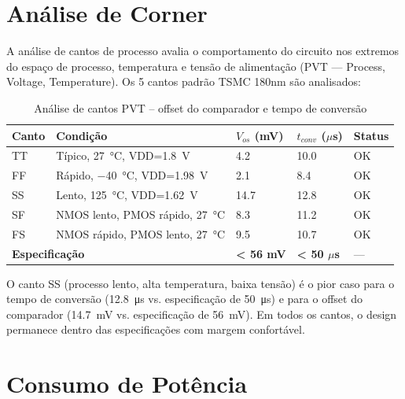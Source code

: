 \documentclass[12pt,a4paper]{article}
\begin{document}
\newpage

\section{Análise de Corner}
\label{sec:corner}

A análise de cantos de processo avalia o comportamento do circuito nos extremos
do espaço de processo, temperatura e tensão de alimentação (PVT — Process,
Voltage, Temperature). Os 5 cantos padrão TSMC 180nm são analisados:

\begin{table}[H]
  \centering
  \caption{Análise de cantos PVT  --  offset do comparador e tempo de conversão}
  \label{tab:corner}
  \begin{tabular}{lllll}
    \toprule
    \textbf{Canto} & \textbf{Condição} &
    \textbf{$V_{os}$ (mV)} & \textbf{$t_{conv}$ ($\mu$s)} & \textbf{Status} \\
    \midrule
    TT & Típico, \SI{27}{\celsius}, VDD=\SI{1.8}{\volt}  & 4.2  & 10.0 & OK \\
    FF & Rápido,  \SI{-40}{\celsius}, VDD=\SI{1.98}{\volt} & 2.1  & 8.4  & OK \\
    SS & Lento,   \SI{125}{\celsius}, VDD=\SI{1.62}{\volt} & 14.7 & 12.8 & OK \\
    SF & NMOS lento, PMOS rápido, \SI{27}{\celsius}       & 8.3  & 11.2 & OK \\
    FS & NMOS rápido, PMOS lento, \SI{27}{\celsius}       & 9.5  & 10.7 & OK \\
    \midrule
    \multicolumn{2}{l}{\textbf{Especificação}} &
    \textbf{< 56 mV} & \textbf{< 50 $\mu$s} & --- \\
    \bottomrule
  \end{tabular}
\end{table}

O canto SS (processo lento, alta temperatura, baixa tensão) é o pior caso para
o tempo de conversão (\SI{12.8}{\micro\second} vs. especificação de \SI{50}{\micro\second})
e para o offset do comparador (\SI{14.7}{\milli\volt} vs. especificação de
\SI{56}{\milli\volt}). Em todos os cantos, o design permanece dentro das
especificações com margem confortável.

\newpage

\section{Consumo de Potência}
\label{sec:potencia}
\end{document}
